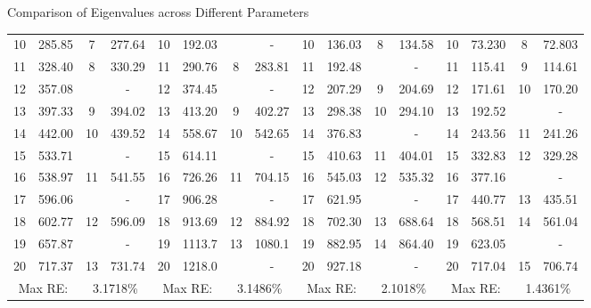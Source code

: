 \documentclass[8pt]{beamer}
\begin{document}
\begin{frame}{Comparison of Eigenvalues across Different Parameters}
{\begin{tabular}{|cccc||cccc||cccc||cccc|}
                {10} & 285.85 & 7     & 277.64 & {10}    & {192.03} &      & {-} & 10    & 136.03 & 8     & 134.58 & 10    & 73.230 & 8     & 72.803 \\
                {11} & 328.40 & 8     & 330.29 & 11    & 290.76 & 8     & 283.81 & {11}    & {192.48} &       & {-} & 11    & 115.41 & 9     & 114.61 \\
                {12} & {357.08} &       & {-} & {12}    & {374.45} &       & {-} & 12    & 207.29 & 9     & 204.69 & 12    & 171.61 & 10    & 170.20 \\
                {13} & 397.33 & 9     & 394.02 & 13    & 413.20 & 9     & 402.27 & 13    & 298.38 & 10    & 294.10 & {13}    & {192.52} &       & {-} \\
                {14} & 442.00   & 10    & 439.52 & 14    & 558.67 & 10    & 542.65 & {14}    & {376.83} &       & {-} & 14    & 243.56 & 11    & 241.26 \\
                {15} & {533.71} &       & {-} & {15}    & {614.11} &       & {-} & 15    & 410.63 & 11    & 404.01 & 15    & 332.83 & 12    & 329.28 \\
                {16} & 538.97 & 11    & 541.55 & 16    & 726.26 & 11    & 704.15 & 16    & 545.03 & 12    & 535.32 & {16}    & {377.16} &       & {-} \\
                {17} & {596.06} &       & {-} & {17}    & {906.28} &       & {-} & {17}    & {621.95} &       & {-} & 17    & 440.77 & 13    & 435.51 \\
                {18} & 602.77 & 12    & 596.09 & 18    & 913.69 & 12    & 884.92 & 18    & 702.30 & 13    & 688.64 & 18    & 568.51 & 14    & 561.04 \\
                {19} & {657.87} &       & {-} & 19    & 1113.7 & 13    & 1080.1 & 19    & 882.95 & 14    & 864.40 & {19}    & {623.05} &       & {-} \\
                {20} & 717.37 & 13    & 731.74 & {20}    & {1218.0}  &       & {-} & {20}    & {927.18} &       & {-} & 20    & 717.04 & 15    & 706.74 \\
                \hline
                \multicolumn{2}{|c}{Max RE:} & \multicolumn{2}{c||}{3.1718\%} & \multicolumn{2}{c}{Max RE:} & \multicolumn{2}{c||}{3.1486\%} & \multicolumn{2}{c}{Max RE:} & \multicolumn{2}{c||}{2.1018\%} & \multicolumn{2}{c}{Max RE:} & \multicolumn{2}{c|}{1.4361\%} \\
                \hline
            \end{tabular}}
        \end{frame}
        
\end{document}

